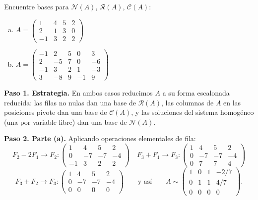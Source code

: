 \begin{example}
Encuentre bases para $\mathcal{N}(A)$, $\mathcal{R}(A)$, $\mathcal{C}(A)$:
\begin{enumerate}[(a)]
\item $A = \begin{pmatrix} 1 & 4 & 5 & 2 \\ 2 & 1 & 3 & 0 \\ -1 & 3 & 2 & 2 \end{pmatrix}$
\item $A = \begin{pmatrix} -1 & 2 & 5 & 0 & 3 \\ 2 & -5 & 7 & 0 & -6 \\ -1 & 3 & 2 & 1 & -3 \\ 3 & -8 & 9 & -1 & 9 \end{pmatrix}$
\end{enumerate}

\begin{myproof}
\textbf{Paso 1. Estrategia.} En ambos casos reducimos $A$ a su forma escalonada reducida: las filas no nulas dan una base de $\mathcal{R}(A)$, las columnas de $A$ en las posiciones pivote dan una base de $\mathcal{C}(A)$, y las soluciones del sistema homogéneo (una por variable libre) dan una base de $\mathcal{N}(A)$.

\textbf{Paso 2. Parte (a).} Aplicando operaciones elementales de fila:
$$F_2 - 2F_1 \to F_2: \begin{pmatrix} 1 & 4 & 5 & 2 \\ 0 & -7 & -7 & -4 \\ -1 & 3 & 2 & 2 \end{pmatrix}
\quad
F_3 + F_1 \to F_3: \begin{pmatrix} 1 & 4 & 5 & 2 \\ 0 & -7 & -7 & -4 \\ 0 & 7 & 7 & 4 \end{pmatrix}$$
$$F_3 + F_2 \to F_3: \begin{pmatrix} 1 & 4 & 5 & 2 \\ 0 & -7 & -7 & -4 \\ 0 & 0 & 0 & 0 \end{pmatrix}
\qquad\text{y así}\qquad
A \sim \begin{pmatrix} 1 & 0 & 1 & -2/7 \\ 0 & 1 & 1 & 4/7 \\ 0 & 0 & 0 & 0 \end{pmatrix}.$$


\end{myproof}
\end{example}
